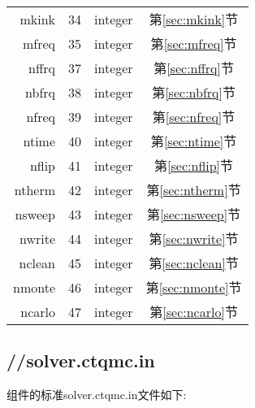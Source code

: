 \begin{longtable}{rccc}
mkink    & 34       & integer  &第\ref{sec:mkink}节 \\
mfreq    & 35       & integer  &第\ref{sec:mfreq}节 \\
nffrq    & 37       & integer  &第\ref{sec:nffrq}节 \\
nbfrq    & 38       & integer  &第\ref{sec:nbfrq}节 \\
nfreq    & 39       & integer  &第\ref{sec:nfreq}节 \\
ntime    & 40       & integer  &第\ref{sec:ntime}节 \\
nflip    & 41       & integer  &第\ref{sec:nflip}节 \\
ntherm   & 42       & integer  &第\ref{sec:ntherm}节\\
nsweep   & 43       & integer  &第\ref{sec:nsweep}节\\
nwrite   & 44       & integer  &第\ref{sec:nwrite}节\\
nclean   & 45       & integer  &第\ref{sec:nclean}节\\
nmonte   & 46       & integer  &第\ref{sec:nmonte}节\\
ncarlo   & 47       & integer  &第\ref{sec:ncarlo}节\\
\hline
\hline
\end{longtable}

\subsection{{\narcissus}//solver.ctqmc.in}

{\narcissus}组件的标准solver.ctqmc.in文件如下:

